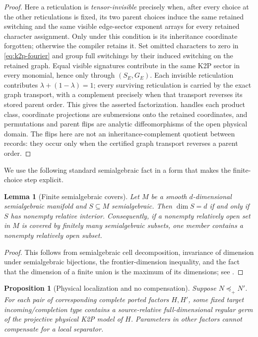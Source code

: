 \documentclass[11pt]{article}
\newtheorem{proposition}[theorem]{Proposition}
\newtheorem{lemma}[theorem]{Lemma}
\theoremstyle{remark}
\newcommand{\preceqplus}{\preceq_+}
\newcommand{\1}{\mathbf 1}
\begin{document}
\begin{proof}
Here a reticulation is \emph{tensor-invisible} precisely when, after every
choice at the other reticulations is fixed, its two parent choices induce the
same retained switching and the same visible edge-sector exponent arrays for
every retained character assignment.  Only under this condition is its
inheritance coordinate forgotten; otherwise the compiler retains it.
Set omitted characters to zero in \eqref{eq:k2p-fourier} and group full
switchings by their induced switching on the retained graph.  Equal visible
signatures contribute in the same K2P sector in every monomial, hence only
through \((S_E,G_E)\).  Each invisible reticulation contributes
\(\lambda+(1-\lambda)=1\); every surviving reticulation is carried by the
exact graph transport, with a complement precisely when that transport
reverses its stored parent order.  This gives the asserted factorization.
 handles each product class, coordinate projections are
submersions onto the retained coordinates, and permutations and parent flips
are analytic diffeomorphisms of the open physical domain.  The flips here are
not an inheritance-complement quotient between records: they occur only when
the certified graph transport reverses a parent order.
\end{proof}

We use the following standard semialgebraic fact in a form that makes the
finite-choice step explicit.

\begin{lemma}[Finite semialgebraic covers]\label{lem:finite-cover}
Let \(M\) be a smooth \(d\)-dimensional semialgebraic manifold and
\(S\subseteq M\) semialgebraic.  Then \(\dim S=d\) if and only if \(S\) has
nonempty relative interior.  Consequently, if a nonempty relatively open set
in \(M\) is covered by finitely many semialgebraic subsets, one member contains
a nonempty relatively open subset.
\end{lemma}

\begin{proof}
This follows from semialgebraic cell decomposition, invariance of dimension
under semialgebraic bijections, the frontier-dimension inequality, and the
fact that the dimension of a finite union is the maximum of its dimensions;
see \cite[Section~2.8]{BochnakCosteRoy1998}.
\end{proof}

\begin{proposition}[Physical localization and no compensation]
\label{prop:localization}
Suppose \(N\preceqplus N'\).  For each pair of corresponding complete ported
factors \(H,H'\), some fixed target incoming/completion type contains a
source-relative full-dimensional regular germ of the projective physical K2P
model of \(H\).  Parameters in other factors cannot compensate for a local
separator.
\end{proposition}
\end{document}
